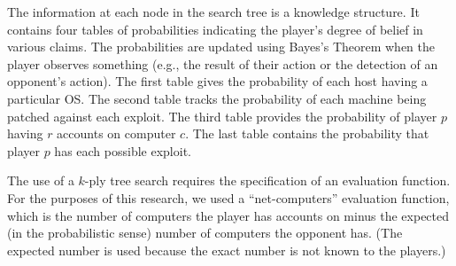 The information at each node in the search tree is a knowledge structure. It contains four tables of probabilities indicating the player's degree of belief in various claims. 
The probabilities are updated using Bayes's Theorem when the player observes something (e.g., the result of their action or the detection of an opponent's action).
The first table gives the probability of each host having a particular OS. The second table tracks the probability of each machine being patched against each exploit. The third table provides the probability of player $p$ having $r$ accounts on computer $c$. The last table contains the probability that player $p$ has each possible exploit. 

The use of a $k$-ply tree search requires the specification of an evaluation function. For the purposes of this research, we used a ``net-computers'' evaluation function, which is the number of computers the player has accounts on minus the expected (in the probabilistic sense) number of computers the opponent has. (The expected number is used because the exact number is not known to the players.) 
